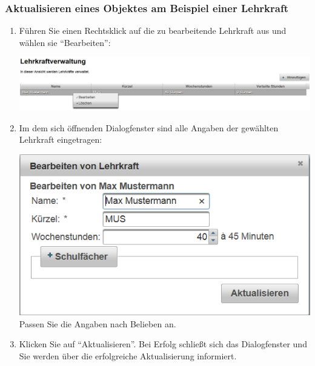 \documentclass[fontsize=12pt]{scrartcl}
\begin{document}
\subsubsection{Aktualisieren eines Objektes am Beispiel einer Lehrkraft}

\begin{enumerate}
\item Führen Sie einen Rechtsklick auf die zu bearbeitende Lehrkraft aus und wählen sie "`Bearbeiten"': \medskip\\
	\begin{minipage}[t]{\linewidth}
            \includegraphics[width=1\linewidth]{images/editTeacher.png}
    \end{minipage}
\item Im dem sich öffnenden Dialogfenster sind alle Angaben der gewählten Lehrkraft eingetragen: \medskip\\
	\begin{minipage}[t]{\linewidth}
            \includegraphics[width=.8\linewidth]{images/editTeacherDialog.png}
    \medskip\\ Passen Sie die Angaben nach Belieben an.
    \end{minipage}
\item Klicken Sie auf "`Aktualisieren"'. Bei Erfolg schließt sich das Dialogfenster und Sie werden über die erfolgreiche Aktualisierung informiert. 
\end{enumerate}
\end{document}
